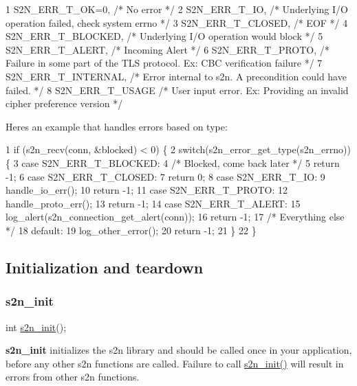 \begin{DoxyCode}
1 S2N\_ERR\_T\_OK=0, /* No error */
2 S2N\_ERR\_T\_IO, /* Underlying I/O operation failed, check system errno */
3 S2N\_ERR\_T\_CLOSED, /* EOF */
4 S2N\_ERR\_T\_BLOCKED, /* Underlying I/O operation would block */
5 S2N\_ERR\_T\_ALERT, /* Incoming Alert */
6 S2N\_ERR\_T\_PROTO, /* Failure in some part of the TLS protocol. Ex: CBC verification failure */
7 S2N\_ERR\_T\_INTERNAL, /* Error internal to s2n. A precondition could have failed. */
8 S2N\_ERR\_T\_USAGE /* User input error. Ex: Providing an invalid cipher preference version */
\end{DoxyCode}


Here\textquotesingle{}s an example that handles errors based on type\+:


\begin{DoxyCode}
1 if (s2n\_recv(conn, &blocked) < 0) \{
2     switch(s2n\_error\_get\_type(s2n\_errno)) \{
3         case S2N\_ERR\_T\_BLOCKED:
4             /* Blocked, come back later */
5             return -1;
6         case S2N\_ERR\_T\_CLOSED:
7             return 0;
8         case S2N\_ERR\_T\_IO:
9             handle\_io\_err();
10             return -1;
11         case S2N\_ERR\_T\_PROTO:
12             handle\_proto\_err();
13             return -1;
14         case S2N\_ERR\_T\_ALERT:
15             log\_alert(s2n\_connection\_get\_alert(conn));
16             return -1;
17         /* Everything else */
18         default:
19             log\_other\_error();
20             return -1;
21     \}
22 \}
\end{DoxyCode}


\subsection*{Initialization and teardown}

\subsubsection*{s2n\+\_\+init}


\begin{DoxyCode}
\textcolor{keywordtype}{int} \hyperlink{s2n_8h_abc620f8194383c6fcddd911edcf7d692}{s2n\_init}();
\end{DoxyCode}


{\bfseries s2n\+\_\+init} initializes the s2n library and should be called once in your application, before any other s2n functions are called. Failure to call \hyperlink{s2n_8h_abc620f8194383c6fcddd911edcf7d692}{s2n\+\_\+init()} will result in errors from other s2n functions.

